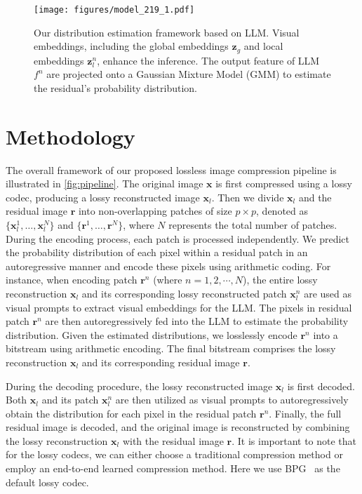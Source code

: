 \begin{figure*}[t]
    \centering
    \texttt{[image: figures/model\_219\_1.pdf]}
    \caption{Our distribution estimation framework based on LLM. Visual embeddings, including the global embeddings $\mathbf{z}_{g}$ and local embeddings $\mathbf{z}_{l}^n$, enhance the inference. The output feature of LLM $f^n$ are projected onto a Gaussian Mixture Model (GMM) to estimate the residual's probability distribution.}
    \label{fig:model}
\end{figure*}
\section{Methodology}
The overall framework of our proposed lossless image compression pipeline is illustrated in \cref{fig:pipeline}. The original image $\mathbf x$ is first compressed using a lossy codec, producing a lossy reconstructed image $\mathbf{x}_l$. 
Then we divide $\mathbf{x}_l$ and the residual image $\mathbf{r}$ into non-overlapping patches of size $p\times p$, denoted as $\{\mathbf{x}_l^1, \ldots, \mathbf{x}_l^{N}\}$ and $\{\mathbf{r}^1, \ldots, \mathbf{r}^{N}\}$, where $N$ represents the total number of patches. 
During the encoding process, each patch is processed independently.
We predict the probability distribution of each pixel within a residual patch in an autoregressive manner and encode these pixels using arithmetic coding.
For instance, when encoding patch $\mathbf{r}^n$ (where $n=1,2,\cdots,N$), the entire lossy reconstruction $\mathbf{x}_l$ and its corresponding lossy reconstructed patch $\mathbf{x}_l^n$ are used as visual prompts to extract visual embeddings for the LLM. The pixels in residual patch $\mathbf{r}^n$ are then autoregressively fed into the LLM to estimate the probability distribution.
Given the estimated distributions, we losslessly encode $\mathbf{r}^n$ into a bitstream using arithmetic encoding. The final bitstream comprises the lossy reconstruction $\mathbf{x}_l$ and its corresponding residual image $\mathbf{r}$. 

During the decoding procedure, the lossy reconstructed image $\mathbf{x}_l$ is first decoded. Both $\mathbf{x}_l$ and its patch $\mathbf{x}_l^n$ are then utilized as visual prompts to autoregressively obtain the distribution for each pixel in the residual patch $\mathbf{r}^n$. 
Finally, the full residual image is decoded, and the original image is reconstructed by combining the lossy reconstruction $\mathbf{x}_l$ with the residual image $\mathbf{r}$. 
It is important to note that for the lossy codecs, we can either choose a traditional compression method or employ an end-to-end learned compression method. Here we use BPG~\cite{bpg} as the default lossy codec.

